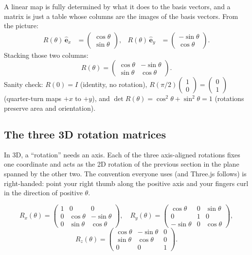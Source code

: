 \documentclass{article}
\begin{document}
A linear map is fully determined by what it does to the basis vectors, and a
matrix is just a table whose columns are the images of the basis vectors. From
the picture:
\begin{align*}
R(\theta)\,\hat{\mathbf{e}}_x &= \begin{pmatrix}\cos\theta\\ \sin\theta\end{pmatrix}, &
R(\theta)\,\hat{\mathbf{e}}_y &= \begin{pmatrix}-\sin\theta\\ \cos\theta\end{pmatrix}.
\end{align*}
Stacking those two columns:
\begin{equation*}
R(\theta) = \begin{pmatrix}\cos\theta & -\sin\theta\\ \sin\theta & \cos\theta\end{pmatrix}.
\end{equation*}
Sanity check: $R(0) = I$ (identity, no rotation), $R(\pi/2)\begin{pmatrix}1\\0\end{pmatrix} = \begin{pmatrix}0\\1\end{pmatrix}$
(quarter-turn maps $+x$ to $+y$), and $\det R(\theta) = \cos^2\theta + \sin^2\theta = 1$
(rotations preserve area and orientation).

\subsection{The three 3D rotation matrices}

In 3D, a ``rotation'' needs an axis. Each of the three axis-aligned rotations
fixes one coordinate and acts as the 2D rotation of the previous section in the
plane spanned by the other two. The convention everyone uses (and Three.js
follows) is right-handed: point your right thumb along the positive axis and
your fingers curl in the direction of positive $\theta$.

\begin{equation*}
R_x(\theta) = \begin{pmatrix}
1 & 0 & 0\\
0 & \cos\theta & -\sin\theta\\
0 & \sin\theta & \cos\theta
\end{pmatrix},\quad
R_y(\theta) = \begin{pmatrix}
\cos\theta & 0 & \sin\theta\\
0 & 1 & 0\\
-\sin\theta & 0 & \cos\theta
\end{pmatrix},
\end{equation*}
\begin{equation*}
R_z(\theta) = \begin{pmatrix}
\cos\theta & -\sin\theta & 0\\
\sin\theta & \cos\theta & 0\\
0 & 0 & 1
\end{pmatrix}.
\end{equation*}
\end{document}
